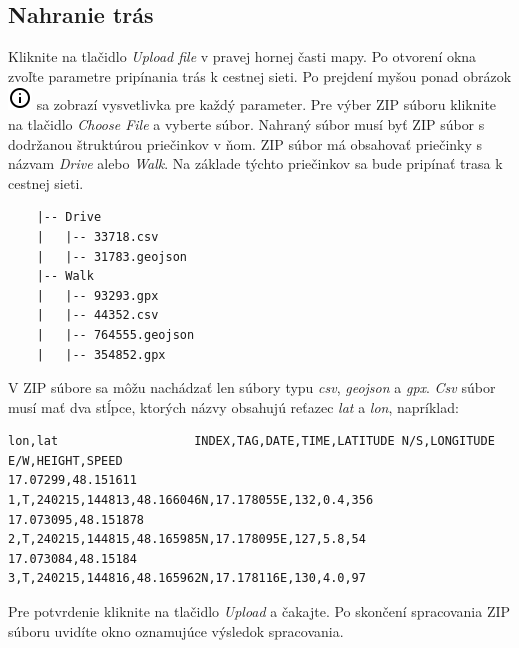 \subsection{Nahranie trás}
Kliknite na tlačidlo \textit{Upload file} v pravej hornej časti mapy. Po otvorení okna zvoľte parametre pripínania trás k cestnej sieti. Po prejdení myšou ponad obrázok \includegraphics[scale=0.5]{img/icons/info.png} sa zobrazí vysvetlivka pre každý parameter. Pre výber ZIP súboru kliknite na tlačidlo \textit{Choose File} a vyberte súbor. Nahraný súbor musí byť ZIP súbor s dodržanou štruktúrou priečinkov v ňom. ZIP súbor má obsahovať priečinky s názvam \textit{Drive} alebo \textit{Walk}. Na základe týchto priečinkov sa bude pripínať trasa k cestnej sieti. 
\begin{verbatim}
    |-- Drive
    |   |-- 33718.csv
    |   |-- 31783.geojson
    |-- Walk
    |   |-- 93293.gpx
    |   |-- 44352.csv
    |   |-- 764555.geojson
    |   |-- 354852.gpx
\end{verbatim}
V ZIP súbore sa môžu nachádzať len súbory typu \textit{csv}, \textit{geojson} a \textit{gpx}.
\textit{Csv} súbor musí mať dva stĺpce, ktorých názvy obsahujú reťazec \textit{lat} a \textit{lon}, napríklad:
\begin{verbatim}
lon,lat                   INDEX,TAG,DATE,TIME,LATITUDE N/S,LONGITUDE E/W,HEIGHT,SPEED
17.07299,48.151611        1,T,240215,144813,48.166046N,17.178055E,132,0.4,356
17.073095,48.151878       2,T,240215,144815,48.165985N,17.178095E,127,5.8,54
17.073084,48.15184        3,T,240215,144816,48.165962N,17.178116E,130,4.0,97 
\end{verbatim}
Pre potvrdenie kliknite na tlačidlo \textit{Upload} a čakajte. Po skončení spracovania ZIP súboru uvidíte okno oznamujúce výsledok spracovania.
